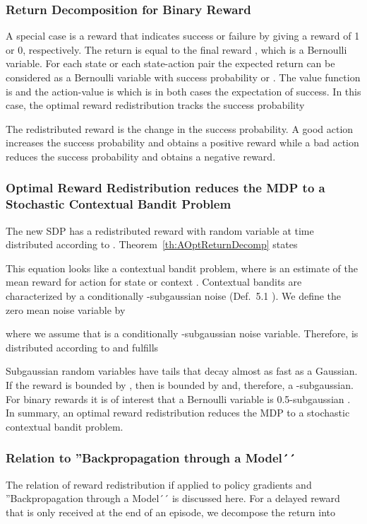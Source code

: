 \documentclass{article}
\begin{document}
\begin{appendices}
\subsubsection{Return Decomposition for Binary Reward}
A special case is a reward that indicates success or failure by giving 
a reward of 1 or 0, respectively. 
The return is equal to the final reward , which is a Bernoulli variable.
For each state  or each
state-action pair  the expected return can be 
considered as a Bernoulli variable with success probability
 or . The value function is 
and  the action-value is  which is in 
both cases the expectation of success. 
In this case, the optimal reward redistribution tracks the success probability
 
The redistributed reward is the change in the success probability. A good action
increases the success probability and obtains a positive reward while a bad action
reduces the success probability and obtains a negative reward.


\subsubsection{Optimal Reward Redistribution reduces the MDP 
to a Stochastic Contextual Bandit Problem}

The new SDP  has a redistributed reward
with random variable  at time  distributed according to .
Theorem~\ref{th:AOptReturnDecomp} states
 
This equation looks like a contextual bandit problem, where
 is an estimate of the mean reward for action 
for state or context .
Contextual bandits \cite[p. 208]{Lattimore:18} are characterized by 
a conditionally -subgaussian noise (Def.~5.1 \cite[p. 68]{Lattimore:18}).
We define the zero mean noise variable  by
 
where we assume that  is a conditionally -subgaussian noise variable. 
Therefore,  is distributed 
according to  and fulfills
 
Subgaussian random variables have tails that decay almost as fast as a Gaussian.
If the reward  is bounded by , then  is bounded by  
and, therefore, a -subgaussian. 
For binary rewards it is of interest that 
a Bernoulli variable is 0.5-subgaussian \cite[p. 71]{Lattimore:18}.
In summary, an optimal reward redistribution reduces the MDP 
to a stochastic contextual bandit problem.






\subsubsection{Relation to ''Backpropagation through a Model´´}
The relation of reward redistribution if applied to policy gradients
and ''Backpropagation through a Model´´ is discussed here.
For a delayed reward that is only received at the end of an episode, 
we decompose the return  into


\end{appendices}
\end{document}
